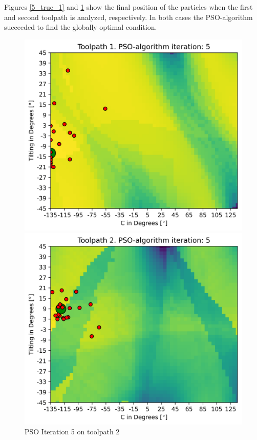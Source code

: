 Figures \ref{5_true_1} and \ref{5_true_2} show the final position of the particles when the first and second toolpath is analyzed, respectively. In both cases the PSO-algorithm succeeded to find the globally optimal condition.
\begin{figure}[H]	
	\centering
	\begin{minipage}{0.5\textwidth}
		\includegraphics[width=\textwidth]{figures/swarm_true/1_5.png}
		\caption{PSO Iteration 5 on toolpath 1}
		\label{5_true_1}
	\end{minipage}\hfill
	\begin{minipage}{0.5\textwidth}
		\includegraphics[width=\textwidth]{figures/swarm_true/2_5.png}
		\caption{PSO Iteration 5 on toolpath 2}
		\label{5_true_2}
	\end{minipage}\par
\end{figure}

